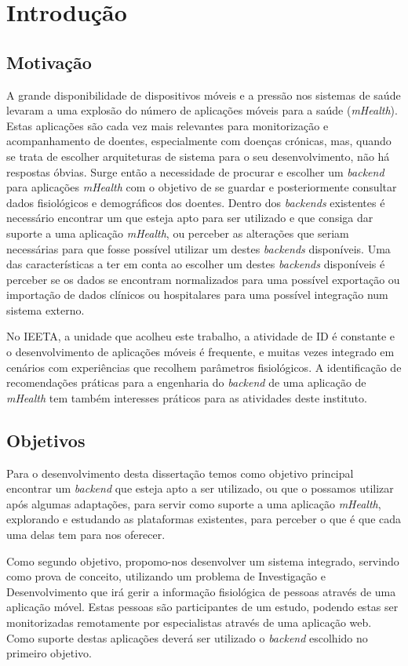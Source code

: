 \chapter{Introdu\c c\~ao}

\section{Motivação}

A grande disponibilidade de dispositivos móveis e a pressão nos sistemas de saúde levaram a uma explosão do número de aplicações móveis para a saúde (\textit{mHealth}). Estas aplicações são cada vez mais relevantes para monitorização e acompanhamento de doentes, especialmente com doenças crónicas, mas, quando se trata de escolher arquiteturas de sistema para o seu desenvolvimento, não há respostas óbvias. Surge então a necessidade de procurar e escolher um \textit{backend} para aplicações \textit{mHealth} com o objetivo de se guardar e posteriormente consultar dados fisiológicos e demográficos dos doentes.
Dentro dos \textit{backends} existentes é necessário encontrar um que esteja apto para ser utilizado e que consiga dar suporte a uma aplicação \textit{mHealth}, ou perceber as alterações que seriam necessárias para que fosse possível utilizar um destes \textit{backends} disponíveis. Uma das características a ter em conta ao escolher um destes \textit{backends} disponíveis é perceber se os dados se encontram normalizados para uma possível exportação ou importação de dados clínicos ou hospitalares para uma possível integração num sistema externo. \par
No \gls{IEETA}, a unidade que acolheu este trabalho, a atividade de \gls{ID} é constante e o desenvolvimento de aplicações móveis é frequente, e muitas vezes integrado em cenários com experiências que recolhem parâmetros fisiológicos. A identificação de recomendações práticas para a engenharia do \textit{backend} de uma aplicação de \textit{mHealth} tem também interesses práticos para as atividades deste instituto.

\section{Objetivos}
Para o desenvolvimento desta dissertação temos como objetivo principal encontrar um \textit{backend} que esteja apto a ser utilizado, ou que o possamos utilizar após algumas adaptações, para servir como suporte a uma aplicação \textit{mHealth}, explorando e estudando as plataformas existentes, para perceber o que é que cada uma delas tem para nos oferecer. \par
Como segundo objetivo, propomo-nos desenvolver um sistema integrado, servindo como prova de conceito, utilizando um problema de Investigação e Desenvolvimento que irá gerir a informação fisiológica de pessoas através de uma aplicação móvel. Estas pessoas são participantes de um estudo, podendo estas ser monitorizadas remotamente por especialistas através de uma aplicação web. Como suporte destas aplicações deverá ser utilizado o \textit{backend} escolhido no primeiro objetivo.
\cleardoublepage